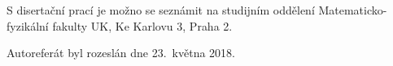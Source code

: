 \vspace{2mm}

\noindent
S disertační prací je možno se seznámit na studijním oddělení
Matematicko-fyzikální fakulty UK, Ke Karlovu 3, Praha 2.

\vspace{1mm}

\noindent
Autoreferát byl rozeslán dne 23.\ května 2018.

\clearpage

\normalsize %

\tableofcontents %
\thispagestyle{empty}










\cleardoublepage

\pagestyle{plain}
\setcounter{page}{1}
